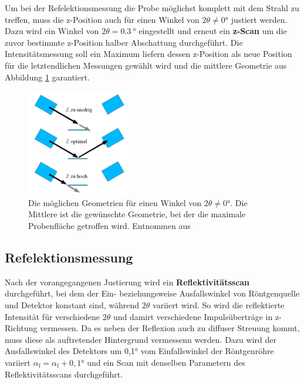         Um bei der Refelektionsmessung die Probe möglichst komplett mit dem Strahl zu treffen, muss die z-Position auch für einen Winkel von $2\theta\neq0°$ justiert werden. Dazu wird ein Winkel von
        $2\theta = \SI{0.3}{\degree}$ eingestellt und erneut ein \textbf{z-Scan} um die zuvor bestimmte z-Position halber Abschattung durchgeführt. Die Intensitätsmessung soll ein Maximum liefern dessen 
        z-Position als neue Position für die letztendlichen Messungen gewählt wird und die mittlere Geometrie aus Abbildung \ref{fig:zScan_Winkel} garantiert.

        \FloatBarrier
        \begin{figure}[h]
            \centering
            \includegraphics[width = 0.4\textwidth]{pictures/zScan_winkel.png}
            \caption{Die möglichen Geometrien für einen Winkel von $2\theta\neq0°$. Die Mittlere ist die gewünschte Geometrie, bei der die maximale Probenfläche getroffen wird. Entnommen aus \cite{tu_dortmund_versuchsanleitung_2022}}
            \label{fig:zScan_Winkel}
          \end{figure}
      
        \FloatBarrier
        
 
    \subsection{Refelektionsmessung}
        Nach der vorangegangenen Justierung wird ein \textbf{Reflektivitätsscan} durchgeführt, bei dem der Ein- beziehungsweise Ausfallswinkel von Röntgenquelle und Detektor konstant sind, während $2\theta$
        variiert wird. So wird die reflektierte Intensität für verschiedene $2\theta$ und damirt verschiedene Impulsüberträge in z-Richtung vermessen. Da es neben der Reflexion auch zu diffuser Streuung kommt,
        muss diese als auftretender Hintergrund vermessenn werden. Dazu wird der Ausfallswinkel des Detektors um 0,1° vom Einfallswinkel der Röntgenröhre variiert $\alpha_{\text{f}} = \alpha_{\text{f}} + 0,1°$
        und ein Scan mit denselben Parametern des Reflektivitätsscans durchgeführt.
    \newpage

